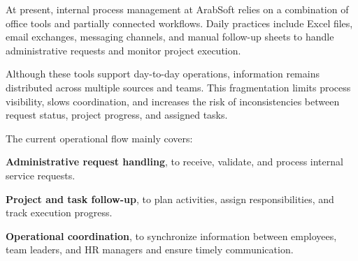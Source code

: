 {\fontsize{12}{18}\selectfont
\setlength{\parindent}{1.2cm}
\setlength{\parskip}{6pt}

\indent At present, internal process management at ArabSoft relies on a combination of office tools and partially connected workflows. Daily practices include Excel files, email exchanges, messaging channels, and manual follow-up sheets to handle administrative requests and monitor project execution.

\indent Although these tools support day-to-day operations, information remains distributed across multiple sources and teams. This fragmentation limits process visibility, slows coordination, and increases the risk of inconsistencies between request status, project progress, and assigned tasks.

\indent The current operational flow mainly covers:

\begin{itemize}[leftmargin=2cm, itemsep=2pt]
  {\fontsize{12}{18}\selectfont
  \item \textbf{Administrative request handling}, to receive, validate, and process internal service requests.
  \item \textbf{Project and task follow-up}, to plan activities, assign responsibilities, and track execution progress.
  \item \textbf{Operational coordination}, to synchronize information between employees, team leaders, and HR managers and ensure timely communication.
  }
\end{itemize}

}

\vspace{6pt}


